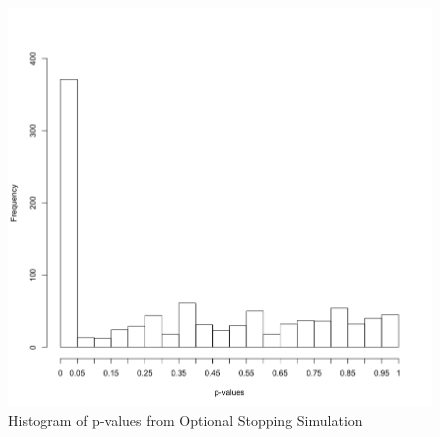 \begin{figure}[h] 
\begin{center}
\includegraphics[scale=0.3]{freqstophist.png}
	\caption{Histogram of p-values from Optional Stopping Simulation}
	\label{fig:freqhistp}
\end{center}	
\end{figure}

